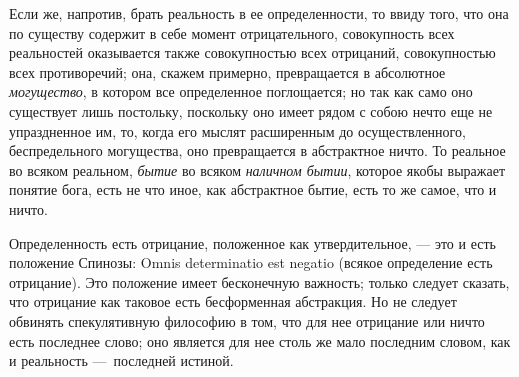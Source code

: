 Если же, напротив, брать реальность в ее определенности, то ввиду того, что
она по существу содержит в себе момент отрицательного, совокупность всех
реальностей оказывается также совокупностью всех отрицаний, совокупностью
всех противоречий; она, скажем примерно, превращается в абсолютное
{\em могущество}, в котором все определенное
поглощается; но так как само оно существует лишь постольку, поскольку оно
имеет рядом с собою нечто еще не упраздненное им, то, когда его мыслят
расширенным до осуществленного, беспредельного могущества, оно превращается
в абстрактное ничто. То реальное во всяком реальном,
{\em бытие} во всяком {\em наличном
бытии}, которое якобы выражает понятие бога, есть не что иное, как
абстрактное бытие, есть то же самое, что и ничто.

Определенность есть отрицание, положенное как утвердительное, — это и есть
положение Спинозы: Omnis determinatio est negatio (всякое определение есть
отрицание). Это положение имеет
бесконечную важность; только следует сказать, что отрицание как таковое
есть бесформенная абстракция. Но не следует обвинять спекулятивную
философию в том, что для нее отрицание или ничто есть последнее слово; оно
является для нее столь же мало последним словом, как и реальность
—~последней истиной.

